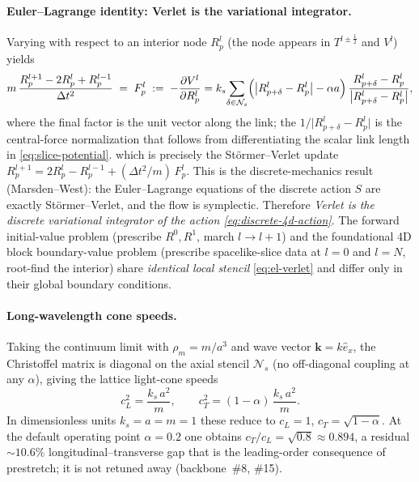 \paragraph{Euler--Lagrange identity: Verlet is the variational integrator.}
Varying  with respect to an interior node $R_p^l$ (the node appears in $T^{l\pm\frac{1}{2}}$ and $V^l$) yields
\begin{equation}
  m\,\frac{R_p^{l+1} - 2R_p^l + R_p^{l-1}}{\Delta t^2}
  \;=\;
  F_p^l
  \;:=\;
  -\frac{\partial V^l}{\partial R_p^l}
  = k_s\!\sum_{\delta\in\mathcal{N}_s}
    \Bigl(\bigl|R_{p+\delta}^l - R_p^l\bigr| - \alpha a\Bigr)
    \,\frac{R_{p+\delta}^l - R_p^l}{\bigl|R_{p+\delta}^l - R_p^l\bigr|},
  \label{eq:el-verlet}
\end{equation}
where the final factor is the unit vector along the link; the $1/\lvert R_{p+\delta}^l-R_p^l\rvert$ is the central-force normalization that follows from differentiating the scalar link length in \eqref{eq:slice-potential}.
which is precisely the Störmer--Verlet update $R_p^{l+1} = 2R_p^l - R_p^{l-1} + (\Delta t^2/m)\,F_p^l$.
This is the discrete-mechanics result (Marsden--West): the Euler--Lagrange equations of the discrete action $S$ are exactly Störmer--Verlet, and the flow is symplectic.
Therefore \emph{Verlet is the discrete variational integrator of the action \eqref{eq:discrete-4d-action}}.
The forward initial-value problem (prescribe $R^0, R^1$, march $l\to l+1$) and the foundational 4D block boundary-value problem (prescribe spacelike-slice data at $l=0$ and $l=N$, root-find the interior) share \emph{identical local stencil} \eqref{eq:el-verlet} and differ only in their global boundary conditions.

\paragraph{Long-wavelength cone speeds.}
Taking the continuum limit with $\rho_m = m/a^3$ and wave vector $\mathbf{k}=k\hat{e}_x$, the Christoffel matrix is diagonal on the axial stencil $\mathcal{N}_s$ (no off-diagonal coupling at any $\alpha$), giving the lattice light-cone speeds
\begin{equation}
  c_L^2 = \frac{k_s\,a^2}{m},
  \qquad
  c_T^2 = (1-\alpha)\,\frac{k_s\,a^2}{m}.
  \label{eq:cone-speeds}
\end{equation}
In dimensionless units $k_s=a=m=1$ these reduce to $c_L=1$, $c_T=\sqrt{1-\alpha}$.
At the default operating point $\alpha=0.2$ one obtains $c_T/c_L=\sqrt{0.8}\approx 0.894$, a residual $\sim 10.6\%$ longitudinal--transverse gap that is the leading-order consequence of prestretch; it is not retuned away (backbone~\#8, \#15).

